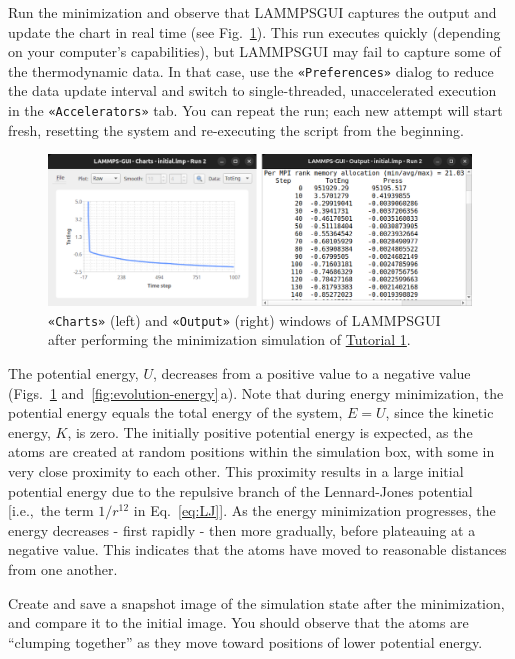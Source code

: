 \documentclass[9pt,tutorial]{livecoms}
\newcommand{\guicmd}[1]{\textcolor{command}{\texttt{«#1»}}} %
\newcommand{\lammpsgui}{\textsf{LAMMPS\textendash GUI}}
\begin{document}
Run the minimization and observe that \lammpsgui{} captures the output
and update the chart in real time (see Fig.~\ref{fig:chart-log}).  This run executes quickly (depending
on your computer's capabilities), but \lammpsgui{} may fail to capture some
of the thermodynamic data.  In that
case, use the \guicmd{Preferences} dialog to reduce the data update
interval and switch to single-threaded, unaccelerated execution in the
\guicmd{Accelerators} tab.  You can repeat the run; each new attempt will start
fresh, resetting the system and re-executing the script from the beginning.

\begin{figure}
\centering
\includegraphics[width=\linewidth]{chart-and-output.png}
\caption{\guicmd{Charts} (left) and \guicmd{Output} (right) windows of \lammpsgui{}
  after performing the minimization simulation of \hyperref[lennard-jones-label]{Tutorial 1}.}
\label{fig:chart-log}
\end{figure}

The potential energy, $U$, decreases from a positive value to a negative value
(Figs.~\ref{fig:chart-log} and~\ref{fig:evolution-energy}\,a).  Note that
during energy minimization, the potential energy equals the total energy
of the system, $E = U$, since the kinetic energy, $K$, is zero.  The
initially positive potential energy is expected, as the atoms are
created at random positions within the simulation box, with some in very
close proximity to each other.  This proximity results in a large
initial potential energy due to the repulsive branch of the
Lennard-Jones potential [i.e.,~the term $1/r^{12}$ in
Eq.~\eqref{eq:LJ}].  As the energy minimization progresses, the energy
decreases - first rapidly - then more gradually, before plateauing at a
negative value.  This indicates that the atoms have moved to reasonable
distances from one another.

Create and save a snapshot image of the simulation state after the
minimization, and compare it to the initial image.  You should observe
that the atoms are ``clumping together'' as they move toward positions
of lower potential energy.
\end{document}
